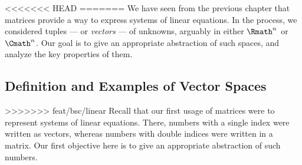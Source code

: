 \label{sec:vectorspace}

<<<<<<< HEAD
=======
We have seen from the previous chapter that
matrices provide a way to express systems of linear equations.
In the process, we considered tuples
--- or \emph{vectors} ---
of unknowns, arguably in either \(\Rmath^n\) or \(\Cmath^n\).
Our goal is to give an appropriate abstraction of such spaces,
and analyze the key properties of them.

\subsection[Definition and Examples]%
    {Definition and Examples of Vector Spaces}
\label{sbc:vspdef}

>>>>>>> feat/bsc/linear
Recall that our first usage of matrices
were to represent systems of linear equations.
There, numbers with a single index were written as vectors,
whereas numbers with double indices were written in a matrix.
Our first objective here
is to give an appropriate abstraction of such numbers.

